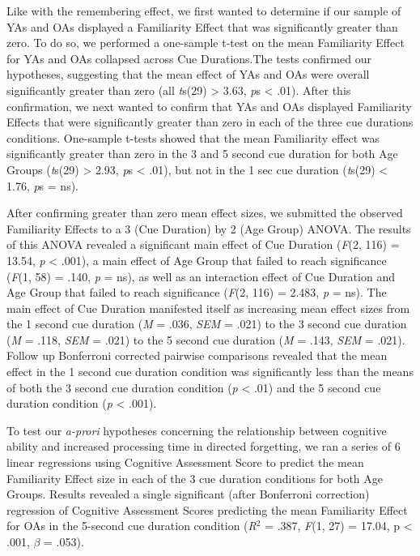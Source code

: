 \documentclass[man]{apa6}\usepackage[]{graphicx}\usepackage[]{color}
\begin{document}
Like with the remembering effect, we first wanted to determine if our sample of YAs and OAs displayed a Familiarity Effect that was significantly greater than zero. To do so, we performed a one-sample t-test on the mean Familiarity Effect for YAs and OAs collapsed across Cue Durations.The tests confirmed our hypotheses, suggesting that the mean effect of YAs and OAs were overall significantly greater than zero (all \textit{t}s(29) > 3.63, \textit{p}s < .01). After this confirmation, we next wanted to confirm that YAs and OAs displayed Familiarity Effects that were significantly greater than zero in each of the three cue durations conditions. One-sample t-tests showed that the mean Familiarity effect was significantly greater than zero in the 3 and 5 second cue duration for both Age Groups (\textit{t}s(29) > 2.93, \textit{p}s < .01), but not in the 1 sec cue duration (\textit{t}s(29) < 1.76, \textit{p}s = ns).

After confirming greater than zero mean effect sizes, we submitted the observed Familiarity Effects to a 3 (Cue Duration) by 2 (Age Group) ANOVA. The results of this ANOVA revealed a significant main effect of Cue Duration (\textit{F}(2, 116) = 13.54, \textit{p} < .001), a main effect of Age Group that failed to reach significance (\textit{F}(1, 58) = .140, \textit{p} = ns), as well as an interaction effect of Cue Duration and Age Group that failed to reach significance (\textit{F}(2, 116) = 2.483, \textit{p} = ns). The main effect of Cue Duration manifested itself as increasing mean effect sizes from the 1 second cue duration (\textit{M} = .036, \textit{SEM} = .021) to the 3 second cue duration (\textit{M} = .118, \textit{SEM} = .021) to the 5 second cue duration (\textit{M} = .143, \textit{SEM} = .021). Follow up Bonferroni corrected pairwise comparisons revealed that the mean effect in the 1 second cue duration condition was significantly less than the means of both the 3 second cue duration condition (\textit{p} < .01) and the 5 second cue duration condition (\textit{p} < .001).

To test our \textit{a-prori} hypotheses concerning the relationship between cognitive ability and increased processing time in directed forgetting, we ran a series of 6 linear regressions using Cognitive Assessment Score to predict the mean Familiarity Effect size in each of the 3 cue duration conditions for both Age Groups. Results revealed a single significant (after Bonferroni correction) regression of Cognitive Assessment Scores predicting the mean Familiarity Effect for OAs in the 5-second cue duration condition (\textit{R}$^{2}$ = .387, \textit{F}(1, 27) = 17.04, p < .001, $\beta$ = .053).
\end{document}
